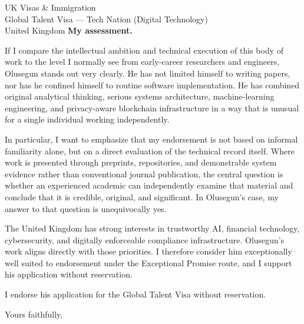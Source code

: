 \documentclass[12pt,a4paper]{letter}
\begin{document}
\begin{letter}{UK Visas \& Immigration\\
Global Talent Visa --- Tech Nation (Digital Technology)\\
United Kingdom}
\textbf{My assessment.}

If I compare the intellectual ambition and technical execution of this
body of work to the level I normally see from early-career researchers
and engineers, Olusegun stands out very clearly.  He has not limited
himself to writing papers, nor has he confined himself to routine
software implementation.  He has combined original analytical thinking,
serious systems architecture, machine-learning engineering, and
privacy-aware blockchain infrastructure in a way that is unusual for a
single individual working independently.

In particular, I want to emphasize that my endorsement is not based on
informal familiarity alone, but on a direct evaluation of the technical
record itself.  Where work is presented through preprints, repositories,
and demonstrable system evidence rather than conventional journal
publication, the central question is whether an experienced academic can
independently examine that material and conclude that it is credible,
original, and significant.  In Olusegun's case, my answer to that
question is unequivocally yes.

The United Kingdom has strong interests in trustworthy AI, financial
technology, cybersecurity, and digitally enforceable compliance
infrastructure.  Olusegun's work aligns directly with those priorities.
I therefore consider him exceptionally well suited to endorsement under
the Exceptional Promise route, and I support his application without
reservation.

I endorse his application for the Global Talent Visa without
reservation.

\closing{Yours faithfully,}

\end{letter}
\end{document}
